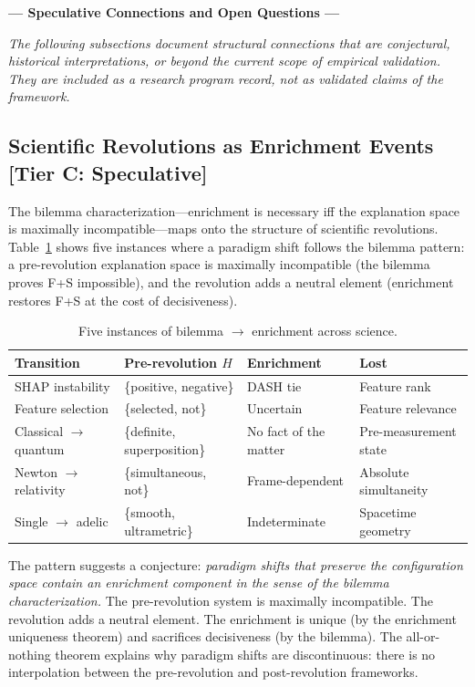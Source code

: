 \documentclass[11pt,a4paper]{article}
\begin{document}
\bigskip
\noindent\textbf{--- Speculative Connections and Open Questions ---}

\medskip
\noindent\emph{The following subsections document structural connections that
are conjectural, historical interpretations, or beyond the current scope
of empirical validation.  They are included as a research program record,
not as validated claims of the framework.}

\subsection{Scientific Revolutions as Enrichment Events\,\textnormal{\normalsize[Tier C: Speculative]}}
\label{sec:revolutions}

The bilemma characterization---enrichment is necessary iff the explanation
space is maximally incompatible---maps onto the structure of scientific
revolutions. Table~\ref{tab:revolutions} shows five instances where a
paradigm shift follows the bilemma pattern: a pre-revolution explanation
space is maximally incompatible (the bilemma proves F+S impossible), and the
revolution adds a neutral element (enrichment restores F+S at the cost
of decisiveness).

\begin{table}[h]
\centering
\small
\caption{Five instances of bilemma $\to$ enrichment across science.}
\label{tab:revolutions}
\begin{tabular}{@{}llll@{}}
\toprule
Transition & Pre-revolution $H$ & Enrichment & Lost \\
\midrule
SHAP instability & \{positive, negative\} & DASH tie & Feature rank \\
Feature selection & \{selected, not\} & Uncertain & Feature relevance \\
Classical $\to$ quantum & \{definite, superposition\} & No fact of the matter & Pre-measurement state \\
Newton $\to$ relativity & \{simultaneous, not\} & Frame-dependent & Absolute simultaneity \\
Single $\to$ adelic & \{smooth, ultrametric\} & Indeterminate & Spacetime geometry \\
\bottomrule
\end{tabular}
\end{table}

The pattern suggests a conjecture: \emph{paradigm shifts that preserve the
configuration space contain an enrichment component in the sense of the
bilemma characterization.}
The pre-revolution system is maximally incompatible. The revolution adds a
neutral element. The enrichment is unique (by the enrichment uniqueness
theorem) and sacrifices decisiveness (by the bilemma). The all-or-nothing
theorem explains why paradigm shifts are discontinuous: there is no
interpolation between the pre-revolution and post-revolution frameworks.
\end{document}
